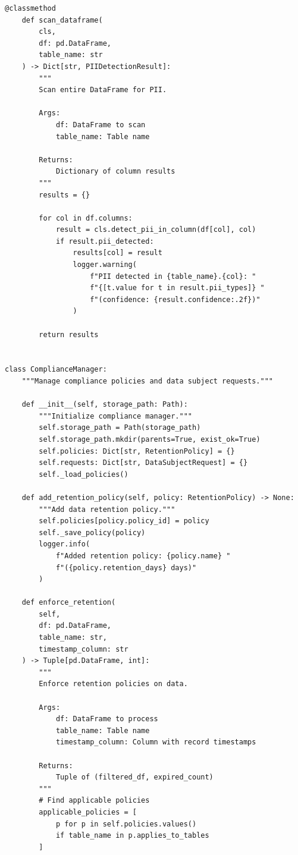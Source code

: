 \begin{lstlisting}[style=python, caption={Comprehensive data privacy compliance framework}]
    @classmethod
    def scan_dataframe(
        cls,
        df: pd.DataFrame,
        table_name: str
    ) -> Dict[str, PIIDetectionResult]:
        """
        Scan entire DataFrame for PII.

        Args:
            df: DataFrame to scan
            table_name: Table name

        Returns:
            Dictionary of column results
        """
        results = {}

        for col in df.columns:
            result = cls.detect_pii_in_column(df[col], col)
            if result.pii_detected:
                results[col] = result
                logger.warning(
                    f"PII detected in {table_name}.{col}: "
                    f"{[t.value for t in result.pii_types]} "
                    f"(confidence: {result.confidence:.2f})"
                )

        return results


class ComplianceManager:
    """Manage compliance policies and data subject requests."""

    def __init__(self, storage_path: Path):
        """Initialize compliance manager."""
        self.storage_path = Path(storage_path)
        self.storage_path.mkdir(parents=True, exist_ok=True)
        self.policies: Dict[str, RetentionPolicy] = {}
        self.requests: Dict[str, DataSubjectRequest] = {}
        self._load_policies()

    def add_retention_policy(self, policy: RetentionPolicy) -> None:
        """Add data retention policy."""
        self.policies[policy.policy_id] = policy
        self._save_policy(policy)
        logger.info(
            f"Added retention policy: {policy.name} "
            f"({policy.retention_days} days)"
        )

    def enforce_retention(
        self,
        df: pd.DataFrame,
        table_name: str,
        timestamp_column: str
    ) -> Tuple[pd.DataFrame, int]:
        """
        Enforce retention policies on data.

        Args:
            df: DataFrame to process
            table_name: Table name
            timestamp_column: Column with record timestamps

        Returns:
            Tuple of (filtered_df, expired_count)
        """
        # Find applicable policies
        applicable_policies = [
            p for p in self.policies.values()
            if table_name in p.applies_to_tables
        ]


\end{lstlisting}
